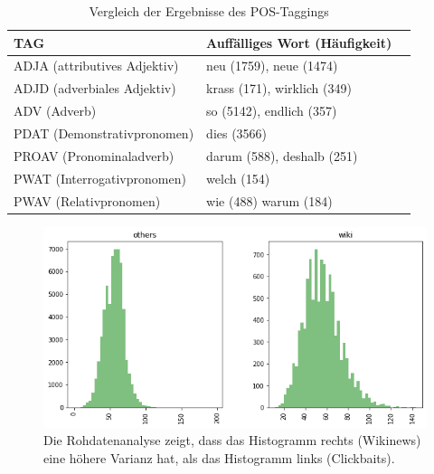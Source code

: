 \begin{table}[h]
    \caption{Vergleich der Ergebnisse des POS-Taggings}
    \label{pos}
    \renewcommand{\arraystretch}{1.2}
    \centering
    \sffamily
    \begin{footnotesize}
        \begin{tabular}{l l l}
            \toprule
            \textbf{TAG}                  & \textbf{Auffälliges Wort (Häufigkeit)} \\
            \midrule
            ADJA  (attributives Adjektiv) & neu (1759), neue (1474)                \\
            ADJD   (adverbiales Adjektiv) & krass (171), wirklich  (349)           \\
            ADV   (Adverb)                & so (5142), endlich (357)               \\
            PDAT (Demonstrativpronomen)   & dies (3566)                            \\
            PROAV   (Pronominaladverb)    & darum (588), deshalb (251)             \\
            PWAT (Interrogativpronomen)   & welch (154)                            \\
            PWAV  (Relativpronomen)       & wie (488) warum (184)                  \\
            \bottomrule
        \end{tabular}
    \end{footnotesize}
    \rmfamily
\end{table}


\begin{figure}[H]
    \centering
    \includegraphics[width=14cm]{kapitel5/hist1wikicl.png}
    \caption[Vergleich der Wortlängen der Schlagzeilen aus den Rohdaten]{Die Rohdatenanalyse zeigt, dass das Histogramm rechts (Wikinews) eine höhere Varianz hat, als das Histogramm links (Clickbaits).}
    \label{Kap5:Hist2}
\end{figure}




